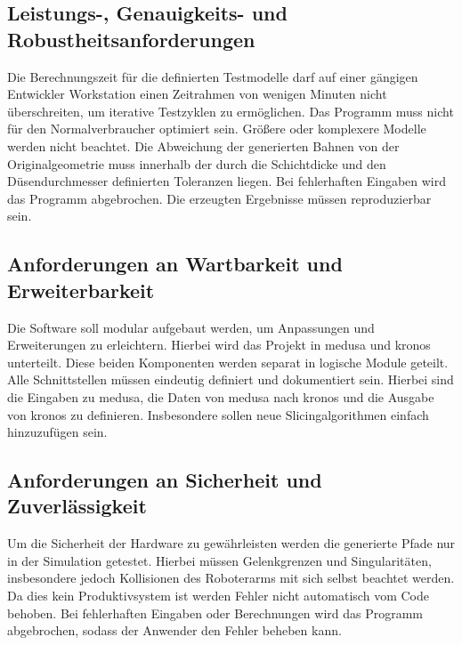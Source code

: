         \subsection{Leistungs-, Genauigkeits- und Robustheitsanforderungen}\label{subsec:performance-accuracy-and-robustness-requirements}
            Die Berechnungszeit für die definierten Testmodelle darf auf einer gängigen Entwickler Workstation einen Zeitrahmen von wenigen Minuten nicht überschreiten,
            um iterative Testzyklen zu ermöglichen.
            Das Programm muss nicht für den Normalverbraucher optimiert sein.
            Größere oder komplexere Modelle werden nicht beachtet.
            Die Abweichung der generierten Bahnen von der Originalgeometrie muss innerhalb der durch die Schichtdicke und den Düsendurchmesser definierten Toleranzen liegen.
            Bei fehlerhaften Eingaben wird das Programm abgebrochen.
            Die erzeugten Ergebnisse müssen reproduzierbar sein.

        \subsection{Anforderungen an Wartbarkeit und Erweiterbarkeit}\label{subsec:requirements-for-maintainability-and-extensibility}
            Die Software soll modular aufgebaut werden, um Anpassungen und Erweiterungen zu erleichtern.
            Hierbei wird das Projekt in \ac{medusa} und \ac{kronos} unterteilt.
            Diese beiden Komponenten werden separat in logische Module geteilt.
            Alle Schnittstellen müssen eindeutig definiert und dokumentiert sein.
            Hierbei sind die Eingaben zu \ac{medusa}, die Daten von \ac{medusa} nach \ac{kronos} und die Ausgabe von \ac{kronos} zu definieren.
            Insbesondere sollen neue Slicingalgorithmen einfach hinzuzufügen sein.

        \subsection{Anforderungen an Sicherheit und Zuverlässigkeit}\label{subsec:requirements-for-safety-and-reliability}
            Um die Sicherheit der Hardware zu gewährleisten werden die generierte Pfade nur in der Simulation getestet.
            Hierbei müssen Gelenkgrenzen und Singularitäten, insbesondere jedoch Kollisionen des Roboterarms mit sich selbst beachtet werden.
            Da dies kein Produktivsystem ist werden Fehler nicht automatisch vom Code behoben.
            Bei fehlerhaften Eingaben oder Berechnungen wird das Programm abgebrochen, sodass der Anwender den Fehler beheben kann.
        
